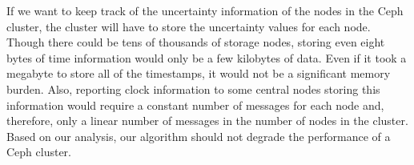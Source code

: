 If we want to keep track of the uncertainty information of the nodes in
the Ceph cluster, the cluster will have to store the uncertainty values
for each node. Though there could be tens of
thousands of storage nodes, storing even eight bytes of time
information would only be a few kilobytes of data. Even if it
took a megabyte to store all of the timestamps, it would not be a
significant memory burden. Also, reporting clock information to some
central nodes storing this information
would require a constant number of messages for each node
and, therefore, only a linear number of messages in the number of
nodes in the cluster.  Based on our analysis, our algorithm should not
degrade the performance of a Ceph cluster.
